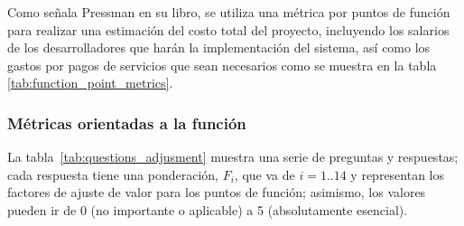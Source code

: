 Como señala Pressman en su libro, se utiliza una métrica por puntos de función para realizar una estimación del costo total del proyecto, incluyendo los salarios de los desarrolladores que harán la implementación del sistema, así como los gastos por pagos de servicios que sean necesarios como se muestra en la tabla \ref{tab:function_point_metrics}.

\subsubsection*{Métricas orientadas a la función}



La tabla~\ref{tab:questions_adjusment} muestra una serie de preguntas y respuestas; cada respuesta tiene una ponderación, $F_i$, que va de $i ={1..14}$ y representan los factores de ajuste de valor para los puntos de función; asimismo, los valores pueden ir de 0 (no importante o aplicable) a 5 (absolutamente esencial).


